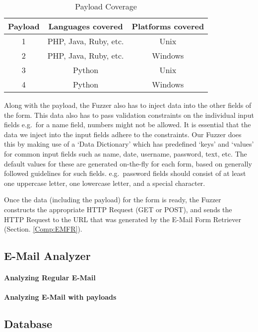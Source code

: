 	\begin{table}[!htbp]
		\centering
		\caption{Payload Coverage}
		\label{tab:payloadcov}
		\begin{tabular}{|c|c|c|}
			\hline
			Payload & Languages covered & Platforms covered\\
			\hline
			1 & PHP, Java, Ruby, etc. & Unix\\
			\hline
			2 & PHP, Java, Ruby, etc. & Windows\\
			\hline
			3 & Python & Unix\\
			\hline
			4 & Python & Windows\\
			\hline
		\end{tabular}
	\end{table}
	Along with the payload, the Fuzzer also has to inject data into the other fields of the form. This data also has to pass validation constraints on the individual input fields e.g.\ for a name field, numbers might not be allowed. It is essential that the data we inject into the input fields adhere to the constraints. Our Fuzzer does this by making use of a `Data Dictionary' which has predefined `keys' and `values' for common input fields such as name, date, username, password, text, etc. The default values for these are generated on-the-fly for each form, based on generally followed guidelines for such fields. e.g.\ password fields should consist of at least one uppercase letter, one lowercase letter, and a special character.
	
	Once the data (including the payload) for the form is ready, the Fuzzer constructs the appropriate HTTP Request (GET or POST), and sends the HTTP Request to the URL that was generated by the E-Mail Form Retriever (Section. \ref{Comp:EMFR}).
	
		
\subsection{E-Mail Analyzer}
	\label{Comp:EMA}
	\paragraph{Analyzing Regular E-Mail}
	\paragraph{Analyzing E-Mail with payloads}
	
\subsection{Database}
